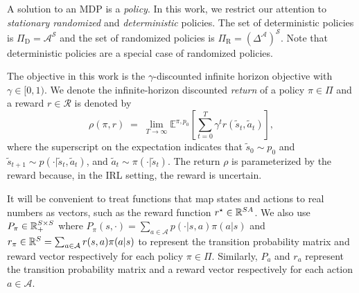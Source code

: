 \documentclass[10pt]{article}
\theoremstyle{plain}
\theoremstyle{remark}
\begin{document}
A solution to an MDP is a \emph{policy}. In this work, we restrict our attention to \emph{stationary randomized} and \emph{deterministic} policies. The set of deterministic policies is $\Pi_{\mathrm{D}}= \mathcal{A}^{\mathcal{S}}$ and the set of randomized policies is $\Pi_{\mathrm{R}} = {\left(\Delta^{\mathcal{A}}\right)}^{\mathcal{S}}$. Note that deterministic policies are a special case of randomized policies. 



The objective in this work is the $\gamma$-discounted infinite horizon objective with $\gamma \in [0,1)$. We denote the infinite-horizon discounted \emph{return} of a policy $\pi \in \Pi$ and a reward $r \in \mathcal{R}$ is denoted by 
\[
  \rho(\pi, r)
  \;=\; \lim_{T\to\infty} \mathbb{E}^{\pi, p_0} \left[   \sum_{t=0}^{T} \gamma^t r(\tilde{s}_t,\tilde{a}_t) \right], 
\]
where the superscript on the expectation indicates that $\tilde{s}_0 \sim p_0$ and $\tilde{s}_{t+1} \sim p(\cdot | \tilde{s}_t,\tilde{a}_t)$, and $\tilde{a}_t \sim \pi(\cdot | \tilde{s}_t)$.  The return $\rho$ is parameterized by the reward because, in the IRL setting, the reward is uncertain. 


It will be convenient to treat functions that map states and actions to real numbers as vectors, such as the reward function $r^{\mathnormal{\star}} \in \mathbb{R}^{SA}$. We also use $P_{\pi} \in \mathbb{R}_+^{S \times S}$ where $P_{\pi}(s,\cdot) = \sum_{a \in \mathcal{A}} p(\cdot | s, a) \pi(a|s)$ and $r_{\pi}\in \mathbb{R}^S = \sum_{a \in \mathcal{A}}r(s, a)\pi(a|s)$ to represent the transition probability matrix and reward vector respectively for each policy $\pi\in \Pi$. Similarly, $P_a$ and $r_a$ represent the transition probability matrix and a reward vector respectively for each action $a\in \mathcal{A}$.
\end{document}
